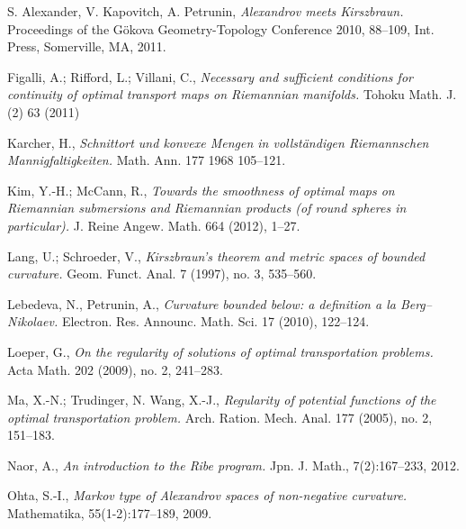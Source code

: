\documentclass{article}
\begin{document}











\begin{thebibliography}{52}
 S. Alexander, V. Kapovitch, A. Petrunin, 
\emph{Alexandrov meets Kirszbraun.} 
Proceedings of the Gökova Geometry-Topology Conference 2010, 88--109, Int. Press, Somerville, MA, 2011.




 Figalli, A.; Rifford, L.; Villani, C.,
\emph{Necessary and sufficient conditions for continuity of optimal transport maps on Riemannian manifolds.} Tohoku Math. J. (2) 63 (2011)

Karcher, H.,
\emph{Schnittort und konvexe Mengen in vollständigen Riemannschen Mannigfaltigkeiten.}
Math. Ann. 177 1968 105--121.

 Kim, Y.-H.; McCann, R.,
\emph{Towards the smoothness of optimal maps on Riemannian submersions and Riemannian products (of round spheres in particular).}
J. Reine Angew. Math. 664 (2012), 1--27. 

  Lang, U.; Schroeder, V.,
\emph{Kirszbraun's theorem and metric spaces of bounded curvature.}
Geom. Funct. Anal. 7 (1997), no. 3, 535–560. 

 Lebedeva, N., Petrunin, A., \emph{Curvature bounded below: a definition a la Berg--Nikolaev.} Electron. Res. Announc. Math. Sci. 17 (2010), 122--124.

Loeper, G.,
\emph{On the regularity of solutions of optimal transportation problems.}
Acta Math. 202 (2009), no. 2, 241–283. 

  Ma, X.-N.; Trudinger, N.  Wang, X.-J.,
\emph{Regularity of potential functions of the optimal transportation problem.}
Arch. Ration. Mech. Anal. 177 (2005), no. 2, 151--183. 

  Naor, A., \emph{An introduction to the Ribe program.} Jpn. J. Math., 7(2):167--233, 2012.

  Ohta, S.-I.,
\emph{Markov type of Alexandrov spaces of non-negative curvature.} Mathematika, 55(1-2):177--189, 2009.


\end{thebibliography}
\end{document}
